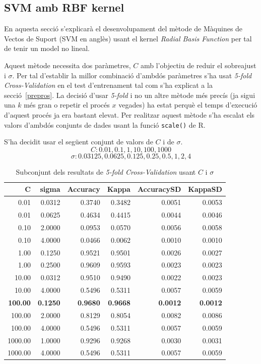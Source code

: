 \subsection{SVM amb RBF kernel}

En aquesta secció s'explicarà el desenvolupament del mètode de Màquines de Vectos de Suport (SVM en anglès) usant el kernel \textit{Radial Basis Function} per tal de tenir un model no lineal. 

Aquest mètode necessita dos paràmetres, $C$ amb l'objectiu de reduir el sobreajust i $\sigma$. Per tal d'establir la millor combinació d'ambdós paràmetres s'ha usat \textit{5-fold Cross-Validation} en el test d'entrenament tal com s'ha explicat a la secció~\ref{prepros}. La decisió d'usar \textit{5-fold} i no un altre mètode més precís (ja sigui una $k$ més gran o repetir el procés $x$ vegades) ha estat perquè el temps d'execució d'aquest procés ja era bastant elevat. Per realitzar aquest mètode s'ha escalat els valors d'ambdós conjunts de dades usant la funció \verb|scale()| de R.

S'ha decidit usar el següent conjunt de valors de $C$ i de $\sigma$. 
\[C: 0.01, 0.1, 1 , 10, 100, 1000\]
\[\sigma: 0.03125, 0.0625, 0.125, 0.25, 0.5, 1, 2, 4\]

\begin{table}[H]
\centering
\begin{adjustbox}{max width=\textwidth}
\begin{tabular}{|r|r|r|r|r|r|}
  \hline
C & sigma & Accuracy & Kappa & AccuracySD & KappaSD \\ 
  \hline
  0.01 & 0.0312 & 0.3740 & 0.3482 & 0.0051 & 0.0053 \\ 
  0.01 & 0.0625 & 0.4634 & 0.4415 & 0.0044 & 0.0046 \\ 
  0.10 & 2.0000 & 0.0953 & 0.0570 & 0.0056 & 0.0058 \\ 
  0.10 & 4.0000 & 0.0466 & 0.0062 & 0.0010 & 0.0010 \\ 
  1.00 & 0.1250 & 0.9521 & 0.9501 & 0.0026 & 0.0027 \\ 
  1.00 & 0.2500 & 0.9609 & 0.9593 & 0.0023 & 0.0023 \\ 
  10.00 & 0.0312 & 0.9510 & 0.9490 & 0.0022 & 0.0023 \\ 
  10.00 & 4.0000 & 0.5496 & 0.5311 & 0.0057 & 0.0059 \\ 
  \textbf{100.00} & \textbf{0.1250} & \textbf{0.9680} & \textbf{0.9668} & \textbf{0.0012} & \textbf{0.0012} \\ 
  100.00 & 2.0000 & 0.8129 & 0.8054 & 0.0082 & 0.0086 \\ 
  100.00 & 4.0000 & 0.5496 & 0.5311 & 0.0057 & 0.0059 \\ 
  1000.00 & 1.0000 & 0.9296 & 0.9268 & 0.0030 & 0.0031 \\ 
  1000.00 & 4.0000 & 0.5496 & 0.5311 & 0.0057 & 0.0059 \\ 
   \hline
\end{tabular}
\end{adjustbox}
\caption{Subconjunt dels resultats de \textit{5-fold Cross-Validation} usant $C$ i $\sigma$}
\label{cvTaula}
\end{table}

